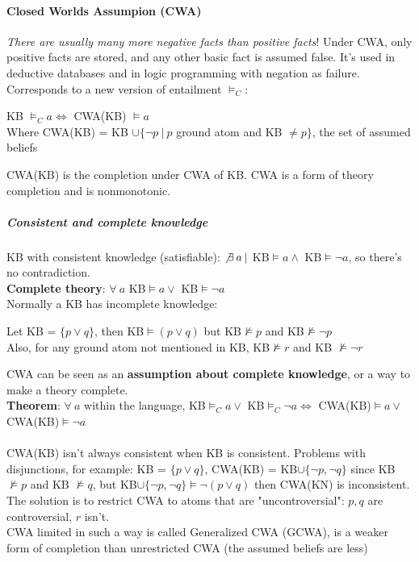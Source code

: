 \documentclass[10pt]{report}
\begin{document}
\paragraph{Closed Worlds Assumpion (CWA)} \textit{There are usually many more negative facts than positive facts}! Under CWA, only positive facts are stored, and any other basic fact is assumed false. It's used in deductive databases and in logic programming with negation as failure. Corresponds to a new version of entailment $\vDash_C$:
\begin{list}{}{}
	\item KB $\vDash_C a \Leftrightarrow$ CWA(KB) $\vDash a$\\
	Where CWA(KB) = KB $\cup\{\neg p\:|\:p$ ground atom and KB $\neq p\}$, the set of assumed beliefs\\
\end{list}
CWA(KB) is the completion under CWA of KB. CWA is a form of theory completion and is nonmonotonic.
\subparagraph{Consistent and complete knowledge} KB with consistent knowledge (satisfiable): $\not\exists\:a\:|$ KB$\vDash a\wedge$ KB$\vDash\neg a$, so there's no contradiction.\\
\textbf{Complete theory}: $\forall\:a$ KB$\vDash a\vee$ KB$\vDash\neg a$\\
Normally a KB has incomplete knowledge:
\begin{list}{}{}
	\item Let KB = $\{p\vee q\}$, then KB$\vDash (p\vee q)$ but KB$\not\vDash p$ and KB$\not\vDash \neg p$\\
	Also, for any ground atom not mentioned in KB, KB$\not\vDash r$ and KB $\not\vDash \neg r$
\end{list}
CWA can be seen as an \textbf{assumption about complete knowledge}, or a way to make a theory complete.\\
\textbf{Theorem}: $\forall\:a$ within the language, KB$\vDash_C a\vee$ KB$\vDash_C\neg a \Leftrightarrow$ CWA(KB)$\vDash a\vee$ CWA(KB)$\vDash\neg a$\\\\
CWA(KB) isn't always consistent when KB is consistent. Problems with disjunctions, for example: KB = $\{p\vee q\}$, CWA(KB) = KB$\cup\{\neg p, \neg q\}$ since KB $\not\vDash p$ and KB $\not\vDash q$, but KB$\cup\{\neg p, \neg q\}\vDash \neg(p\vee q)$ then CWA(KN) is inconsistent. The solution is to restrict CWA to atoms that are "uncontroversial": $p,q$ are controversial, $r$ isn't.\\
CWA limited in such a way is called Generalized CWA (GCWA), is a weaker form of completion than unrestricted CWA (the assumed beliefs are less)
\end{document}

